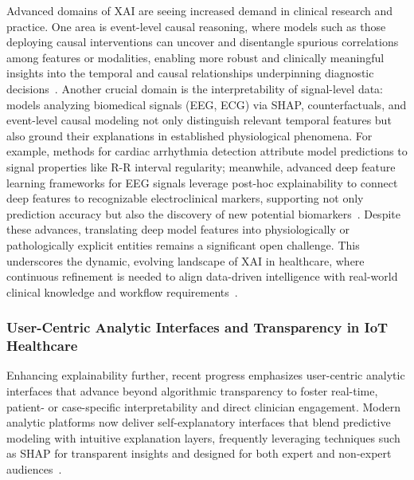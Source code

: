 \documentclass[sigconf]{acmart}
\begin{document}
Advanced domains of XAI are seeing increased demand in clinical research and practice. One area is event-level causal reasoning, where models such as those deploying causal interventions can uncover and disentangle spurious correlations among features or modalities, enabling more robust and clinically meaningful insights into the temporal and causal relationships underpinning diagnostic decisions~\cite{ref32,ref36,ref39}. Another crucial domain is the interpretability of signal-level data: models analyzing biomedical signals (EEG, ECG) via SHAP, counterfactuals, and event-level causal modeling not only distinguish relevant temporal features but also ground their explanations in established physiological phenomena. For example, methods for cardiac arrhythmia detection attribute model predictions to signal properties like R-R interval regularity; meanwhile, advanced deep feature learning frameworks for EEG signals leverage post-hoc explainability to connect deep features to recognizable electroclinical markers, supporting not only prediction accuracy but also the discovery of new potential biomarkers~\cite{ref68,ref98,ref99}. Despite these advances, translating deep model features into physiologically or pathologically explicit entities remains a significant open challenge. This underscores the dynamic, evolving landscape of XAI in healthcare, where continuous refinement is needed to align data-driven intelligence with real-world clinical knowledge and workflow requirements~\cite{ref98,ref99}.

\subsubsection{User-Centric Analytic Interfaces and Transparency in IoT Healthcare}

Enhancing explainability further, recent progress emphasizes user-centric analytic interfaces that advance beyond algorithmic transparency to foster real-time, patient- or case-specific interpretability and direct clinician engagement. Modern analytic platforms now deliver self-explanatory interfaces that blend predictive modeling with intuitive explanation layers, frequently leveraging techniques such as SHAP for transparent insights and designed for both expert and non-expert audiences~\cite{ref87,ref89,ref99,ref106}. 
\end{document}
